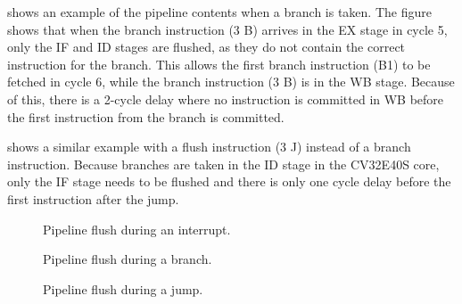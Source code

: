  shows an example of the pipeline contents when a branch is taken. The figure shows that when the branch instruction (3 B) arrives in the EX stage in cycle 5, only the IF and ID stages are flushed, as they do not contain the correct instruction for the branch. This allows the first branch instruction (B1) to be fetched in cycle 6, while the branch instruction (3 B) is in the WB stage. Because of this, there is a 2-cycle delay where no instruction is committed in WB before the first instruction from the branch is committed.

 shows a similar example with a flush instruction (3 J) instead of a branch instruction. Because branches are taken in the ID stage in the CV32E40S core, only the IF stage needs to be flushed and there is only one cycle delay before the first instruction after the jump.

\begin{figure}[htb]
\centering

\caption{Pipeline flush during an interrupt.}
\label{fig:interrupt_flush}
\end{figure}

\begin{figure}[htb]
\centering

\caption{Pipeline flush during a branch.}
\label{fig:branch_flush}
\end{figure}

\begin{figure}[htb]
\centering

\caption{Pipeline flush during a jump.}
\label{fig:jump_flush}
\end{figure}

%            
%        
%            
%            
%    



